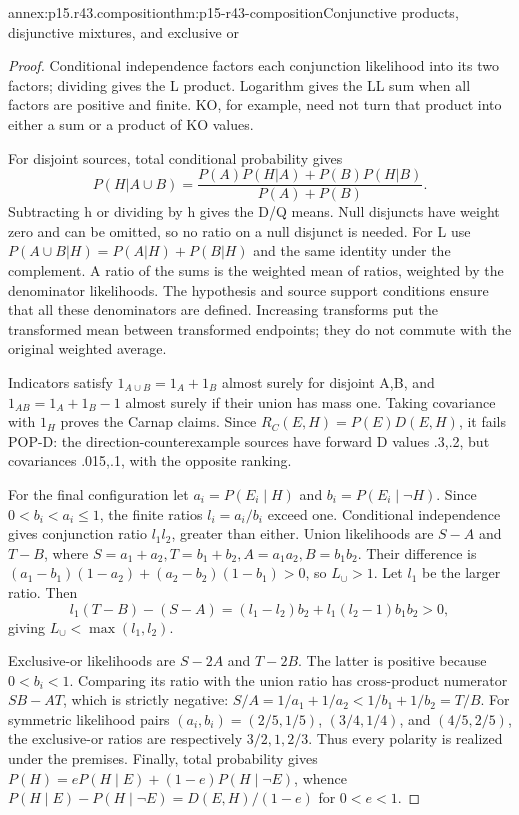\begin{annexitem}{annex:p15.r43.composition}{thm:p15-r43-composition}{Conjunctive products, disjunctive mixtures, and exclusive or}
\begin{proof}
Conditional independence factors each conjunction likelihood into its
two factors; dividing gives the L product. Logarithm gives the LL sum
when all factors are positive and finite. KO, for example, need not
turn that product into either a sum or a product of KO values.

For disjoint sources, total conditional probability gives
\[
 P(H|A\cup B)=\frac{P(A)P(H|A)+P(B)P(H|B)}{P(A)+P(B)}.
\]
Subtracting h or dividing by h gives the D/Q means. Null disjuncts
have weight zero and can be omitted, so no ratio on a null disjunct
is needed. For L use
\(P(A\cup B|H)=P(A|H)+P(B|H)\) and the same identity under
the complement. A ratio of the sums is the weighted mean of ratios,
weighted by the denominator likelihoods. The hypothesis and source
support conditions ensure that all these denominators are defined.
Increasing transforms put the transformed mean between transformed
endpoints; they do not commute with the original weighted average.

Indicators satisfy \(1_{A\cup B}=1_A+1_B\) almost surely for
disjoint A,B, and \(1_{AB}=1_A+1_B-1\) almost surely if their union
has mass one. Taking covariance with \(1_H\) proves the Carnap
claims. Since \(R_C(E,H)=P(E)D(E,H)\), it fails POP-D: the
direction-counterexample sources have forward D values .3,.2, but
covariances .015,.1, with the opposite ranking.

For the final configuration let \(a_i=P(E_i\mid H)\) and
\(b_i=P(E_i\mid\neg H)\). Since \(0<b_i<a_i\leq1\),
the finite ratios \(l_i=a_i/b_i\) exceed one.
Conditional independence gives conjunction ratio \(l_1l_2\),
greater than either. Union likelihoods are
\(S-A\) and \(T-B\), where
\(S=a_1+a_2,T=b_1+b_2,A=a_1a_2,B=b_1b_2\).
Their difference is
\((a_1-b_1)(1-a_2)+(a_2-b_2)(1-b_1)>0\), so \(L_{\cup}>1\).
Let \(l_1\) be the larger ratio. Then
\[
 l_1(T-B)-(S-A)
 =(l_1-l_2)b_2+l_1(l_2-1)b_1b_2>0,
\]
giving \(L_{\cup}<\max(l_1,l_2)\).

Exclusive-or likelihoods are \(S-2A\) and \(T-2B\). The latter is positive
because \(0<b_i<1\). Comparing its ratio with the union ratio has
cross-product numerator \(SB-AT\), which is strictly negative:
\(S/A=1/a_1+1/a_2<1/b_1+1/b_2=T/B\).
For symmetric likelihood pairs \((a_i,b_i)=(2/5,1/5)\),
\((3/4,1/4)\), and \((4/5,2/5)\), the exclusive-or ratios are respectively
\(3/2,1,2/3\). Thus every polarity is realized under the premises.
Finally, total probability gives
\(P(H)=eP(H\mid E)+(1-e)P(H\mid\neg E)\), whence
\(P(H\mid E)-P(H\mid\neg E)=D(E,H)/(1-e)\) for \(0<e<1\).
\end{proof}
\end{annexitem}
